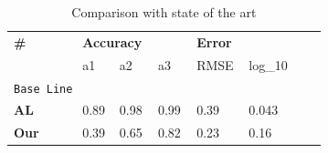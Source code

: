 \begin{table}[h]
\begin{tabular}{p{0.2\linewidth}p{0.05\linewidth}p{0.1\linewidth}p{0.1\linewidth}p{0.08\linewidth}p{0.08\linewidth}p{0.07\linewidth}}
\hline
\textbf{\#} & \multicolumn{3}{l}{\textbf{Accuracy}} & {\textbf{Error}} \\ \cline{3-7} 
    &  a1& a2  & a3    & RMSE & log\_10   \\ \hline
\multicolumn{6}{l}{\texttt{Base Line}}  \\ \hline
\textbf{AL}      &   0.89 & 0.98 & 0.99   & 0.39  &0.043  \\ \hline
\textbf{Our}  &  0.39 & 0.65   &  0.82  & 0.23   &   0.16  \\ \hline


\end{tabular}

\caption{Comparison with state of the art}
\label{table:Results_stateoftheartComplare}
\end{table}







